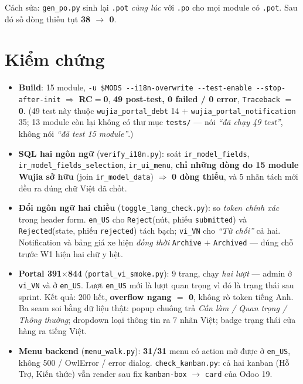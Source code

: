 Cách sửa: \texttt{gen\_po.py} sinh lại \texttt{.pot} \emph{cùng lúc} với \texttt{.po} cho mọi module
có \texttt{.pot}. Sau đó số dòng thiếu tụt \textbf{38 $\rightarrow$ 0}.

\section{Kiểm chứng}

\begin{itemize}
  \item \textbf{Build}: 15 module, \texttt{-u \$MODS -{}-i18n-overwrite -{}-test-enable
    -{}-stop-after-init} $\Rightarrow$ \textbf{RC$=$0}, \textbf{49 post-test, 0 failed / 0 error},
    \texttt{Traceback} $=$ \textbf{0}. (49 test này thuộc \texttt{wujia\_portal\_debt} 14 $+$
    \texttt{wujia\_portal\_notification} 35; 13 module còn lại không có thư mục \texttt{tests/} ---
    nói \emph{``đã chạy 49 test''}, không nói \emph{``đã test 15 module''}.)
  \item \textbf{SQL hai ngôn ngữ} (\texttt{verify\_i18n.py}): soát \texttt{ir\_model\_fields},
    \texttt{ir\_model\_fields\_selection}, \texttt{ir\_ui\_menu}, \textbf{chỉ những dòng do 15 module
    Wujia sở hữu} (join \texttt{ir\_model\_data}) $\Rightarrow$ \textbf{0 dòng thiếu}, và 5 nhãn tách
    mới đều ra đúng chữ Việt đã chốt.
  \item \textbf{Đổi ngôn ngữ hai chiều} (\texttt{toggle\_lang\_check.py}): so \emph{token chính xác}
    trong header form. \texttt{en\_US} cho \texttt{Reject}(nút, phiếu \texttt{submitted}) và
    \texttt{Rejected}(state, phiếu \texttt{rejected}) tách bạch; \texttt{vi\_VN} cho \emph{``Từ
    chối''} cả hai. Notification và bảng giá xe hiện \emph{đồng thời} \texttt{Archive} $+$
    \texttt{Archived} --- đúng chỗ trước W1 hiện hai chữ y hệt.
  \item \textbf{Portal 391$\times$844} (\texttt{portal\_vi\_smoke.py}): 9 trang, chạy \emph{hai lượt}
    --- admin ở \texttt{vi\_VN} và ở \texttt{en\_US}. Lượt \texttt{en\_US} mới là lượt quan trọng vì
    đó là trạng thái sau sprint. Kết quả: 200 hết, \textbf{overflow ngang $=$ 0}, không rò token
    tiếng Anh. Ba seam soi bằng dữ liệu thật: popup chuông trả \emph{Cần làm / Quan trọng / Thông
    thường}; dropdown loại thông tin ra 7 nhãn Việt; badge trạng thái cửa hàng ra tiếng Việt.
  \item \textbf{Menu backend} (\texttt{menu\_walk.py}): \textbf{31/31} menu có action mở được ở
    \texttt{en\_US}, không 500 / OwlError / error dialog. \texttt{check\_kanban.py}: cả hai kanban
    (Hỗ Trợ, Kiến thức) vẫn render sau fix \texttt{kanban-box} $\rightarrow$ \texttt{card} của Odoo 19.
\end{itemize}

